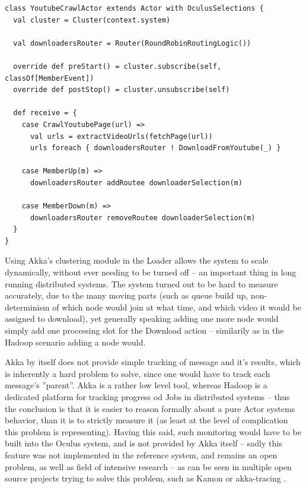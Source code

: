 \newpage
\begin{lstlisting}[caption={Listening for Cluster events in Akka allows the application to dynamically respond to nodes being added to the cluster, and spreading the load in application logic to other nodes.}, label={lst:scaling-akka-cluster}]
class YoutubeCrawlActor extends Actor with OculusSelections {
  val cluster = Cluster(context.system)

  val downloadersRouter = Router(RoundRobinRoutingLogic())

  override def preStart() = cluster.subscribe(self, classOf[MemberEvent])
  override def postStop() = cluster.unsubscribe(self)

  def receive = {
    case CrawlYoutubePage(url) =>
      val urls = extractVideoUrls(fetchPage(url))
      urls foreach { downloadersRouter ! DownloadFromYoutube(_) }

    case MemberUp(m) => 
      downloadersRouter addRoutee downloaderSelection(m)
    
    case MemberDown(m) => 
      downloadersRouter removeRoutee downloaderSelection(m)
  }
}
\end{lstlisting}

Using Akka's clustering module in the Loader allows the system to scale dynamically, without ever needing to be turned off -- an important thing in long running distributed systems. The system turned out to be hard to measure accurately, due to the many moving parts (such as queue build up, non-determinism of which node would join at what time, and which video it would be assigned to download), yet generally speaking adding one more node would simply add one processing slot for the Download action -- similarily as in the Hadoop scenario adding a node would.

Akka by itself does not provide simple tracking of message and it's results, which is inherently a hard problem to solve, since one would have to track each message's ''parent''. Akka is a rather low level tool, whereas Hadoop is a dedicated platform for tracking progress od Jobs in distributed systems -- thus the conclusion is that it is easier to reason formally about a pure Actor systems behavior, than it is to strictly measure it (as least at the level of complication this problem is representing). Having this said, such monitoring would have to be built into the Oculus system, and is not provided by Akka itself -- sadly this feature was not implemented in the reference system, and remains an open problem, as well as field of intensive research -- as can be seen in multiple open source projects trying to solve this problem, such as Kamon \cite{kamon} or akka-tracing \cite{akka-tracing}.

